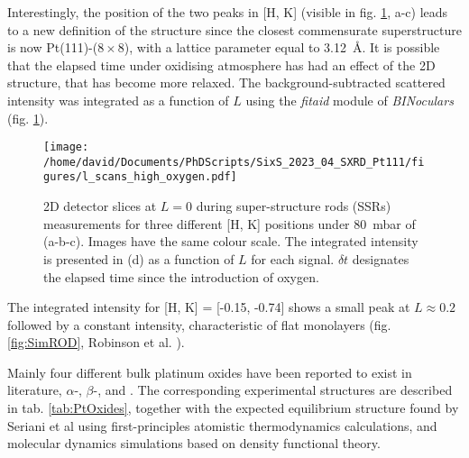 Interestingly, the position of the two peaks in [H, K] (visible in fig. \ref{fig:LScans80}, a-c) leads to a new definition of the structure since the closest commensurate superstructure is now Pt(111)-($8\times8$), with a lattice parameter equal to \qty{3.12}{\angstrom}.
It is possible that the elapsed time under oxidising atmosphere has had an effect of the 2D structure, that has become more relaxed.
The background-subtracted scattered intensity was integrated as a function of $L$ using the \textit{fitaid} module of \textit{BINoculars} (fig. \ref{fig:LScans80}).

\begin{figure}[!htb]
    \centering
    \texttt{[image: /home/david/Documents/PhDScripts/SixS\_2023\_04\_SXRD\_Pt111/figures/l\_scans\_high\_oxygen.pdf]}
    \caption{
        2D detector slices at $L=0$ during super-structure rods (SSRs) measurements for three different [H, K] positions under \qty{80}{\milli\bar} of  (a-b-c).
        Images have the same colour scale.
        The integrated intensity is presented in (d) as a function of $L$ for each signal.
        $\delta t$ designates the elapsed time since the introduction of oxygen.
    }
    \label{fig:LScans80}
\end{figure}

The integrated intensity for [H, K] = [-0.15, -0.74] shows a small peak at $L\approx 0.2$ followed by a constant intensity, characteristic of flat monolayers (fig. \ref{fig:SimROD}, Robinson et al. \cite*{Robinson1991}).

Mainly four different bulk platinum oxides have been reported to exist in literature, $\alpha$-, $\beta$-,  and .
The corresponding experimental structures are described in tab. \ref{tab:PtOxides}, together with the expected equilibrium structure found by Seriani et al \parencite*{Seriani2006, Seriani2008} using first-principles atomistic thermodynamics calculations, and molecular dynamics simulations based on density functional theory.

